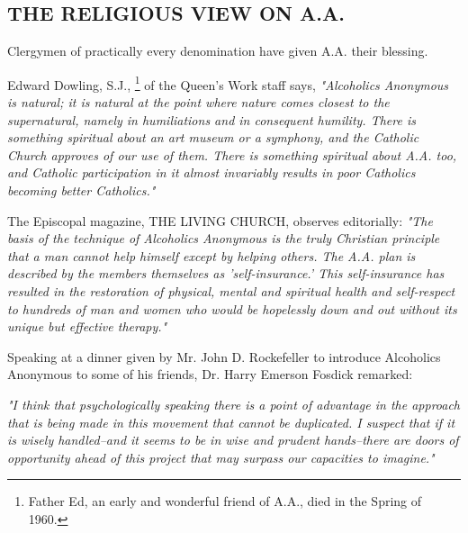 

\subsection*{THE RELIGIOUS VIEW ON A.A.}

\begin{biblechapter}
\verseWithHeading{}
    Clergymen of practically every denomination 
    have given A.A. their blessing.

    Edward Dowling, S.J.,
    \footnote[*]{Father Ed, an early and wonderful friend of A.A., died in the Spring of 1960.}
    of the Queen's Work staff says,
\verse\emph{ "Alcoholics Anonymous is natural; 
    it is natural at the point where nature 
    comes closest to the supernatural,
    namely in humiliations and in consequent humility.
\verse There is something spiritual about an art museum or a symphony, 
    and the Catholic Church approves of our use of them.
\verse There is something spiritual about A.A. too, 
    and Catholic participation in it almost invariably results 
    in poor Catholics becoming better Catholics."
}

    The Episcopal magazine, THE LIVING CHURCH, observes editorially: 
\verse\emph{ "The basis of the technique of Alcoholics Anonymous 
    is the truly Christian principle 
    that a man cannot help himself except by helping others.
    The A.A. plan is described by the members themselves as 
    'self-insurance.'
\verse This self-insurance has resulted in the restoration of 
    physical, mental and spiritual health 
    and self-respect to hundreds of man and women 
    who would be hopelessly down and out 
    without its unique but effective therapy."
}

    Speaking at a dinner given by Mr. John D. Rockefeller 
    to introduce Alcoholics Anonymous to some of his friends,
    Dr. Harry Emerson Fosdick remarked:

\verse\emph{"I think that psychologically speaking 
    there is a point of advantage 
    in the approach that is being made in this movement 
    that cannot be duplicated.
\verse I suspect that if it is wisely handled--and 
    it seems to be in wise and prudent hands--there 
    are doors of opportunity ahead of this project 
    that may surpass our capacities to imagine."
}


\end{biblechapter}
